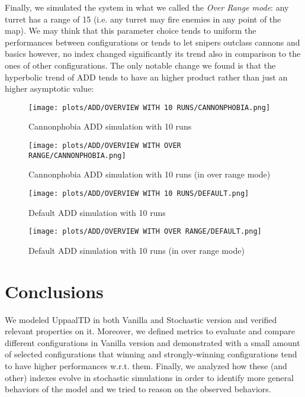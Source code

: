 \documentclass[
10pt, %
a4paper, %
oneside, %
headinclude,footinclude, %
BCOR5mm, %
]{scrartcl}
\begin{document}
			Finally, we simulated the system in what we called the \emph{Over Range mode}: any turret has a range of 15 (i.e. any turret may fire enemies in any point of the map). We may think that this parameter choice tends to uniform the performances between configurations or tends to let snipers outclass cannons and basics however, no index changed significantly its trend also in comparison to the ones of other configurations. The only notable change we found is that the hyperbolic trend of ADD tends to have an higher product rather than just an higher asymptotic value:
			\begin{figure}[H]
				\centering
				\begin{minipage}{.4\textwidth}
					\centering
					\texttt{[image: plots/ADD/OVERVIEW WITH 10 RUNS/CANNONPHOBIA.png]}
					\caption{Cannonphobia ADD simulation with 10 runs}
				\end{minipage}
				\begin{minipage}{.4\textwidth}
					\centering
					\texttt{[image: plots/ADD/OVERVIEW WITH OVER RANGE/CANNONPHOBIA.png]}
					\caption{Cannonphobia ADD simulation with 10 runs (in over range mode)}
				\end{minipage}
			\end{figure}
			\begin{figure}[H]
				\centering
				\begin{minipage}{.4\textwidth}
					\centering
					\texttt{[image: plots/ADD/OVERVIEW WITH 10 RUNS/DEFAULT.png]}
					\caption{Default ADD simulation with 10 runs}
				\end{minipage}
				\begin{minipage}{.4\textwidth}
					\centering
					\texttt{[image: plots/ADD/OVERVIEW WITH OVER RANGE/DEFAULT.png]}
					\caption{Default ADD simulation with 10 runs (in over range mode)}
				\end{minipage}
			\end{figure}
	\section{Conclusions}
		We modeled UppaalTD in both Vanilla and Stochastic version and verified relevant properties on it. Moreover, we defined metrics to evaluate and compare different configurations in Vanilla version and demonstrated with a small amount of selected configurations that winning and strongly-winning configurations tend to have higher performances w.r.t. them. Finally, we analyzed how these (and other) indexes evolve in stochastic simulations in order to identify more general behaviors of the model and we tried to reason on the observed behaviors.
	\newpage
	\appendix
\end{document}
